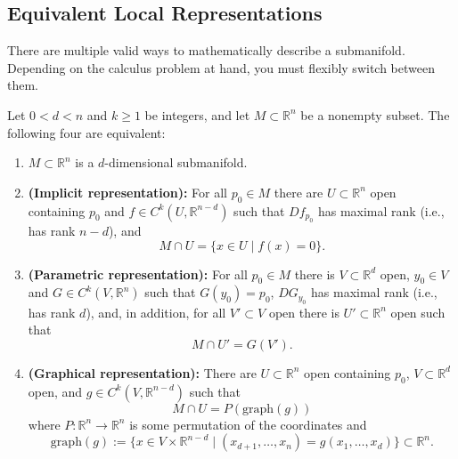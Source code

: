 \subsection{Equivalent Local Representations}

There are multiple valid ways to mathematically describe a submanifold. Depending on the calculus problem at hand, you must flexibly switch between them.

\setcounter{savedSec}{\value{section}}
\setcounter{savedThm}{\value{theorem}}

\setcounter{section}{12}
\setcounter{theorem}{11} %

\begin{proposition}
Let $0 < d < n$ and $k \ge 1$ be integers, and let $M \subset \mathbb{R}^n$ be a nonempty subset. The following four are equivalent:
\begin{enumerate}
    \item $M \subset \mathbb{R}^n$ is a $d$-dimensional submanifold.
    
    \item \textbf{(Implicit representation):} For all $p_0 \in M$ there are $U \subset \mathbb{R}^n$ open containing $p_0$ and $f \in C^k(U, \mathbb{R}^{n-d})$ such that $Df_{p_0}$ has maximal rank (i.e., has rank $n-d$), and
    \[
    M \cap U = \{x \in U \mid f(x) = 0\}.
    \]
    
    \item \textbf{(Parametric representation):} For all $p_0 \in M$ there is $V \subset \mathbb{R}^d$ open, $y_0 \in V$ and $G \in C^k(V, \mathbb{R}^n)$ such that $G(y_0) = p_0$, $DG_{y_0}$ has maximal rank (i.e., has rank $d$), and, in addition, for all $V' \subset V$ open there is $U' \subset \mathbb{R}^n$ open such that 
    \[
    M \cap U' = G(V').
    \]
    
    \item \textbf{(Graphical representation):} There are $U \subset \mathbb{R}^n$ open containing $p_0$, $V \subset \mathbb{R}^d$ open, and $g \in C^k(V, \mathbb{R}^{n-d})$ such that
    \[
    M \cap U = P(\text{graph}(g))
    \]
    where $P : \mathbb{R}^n \to \mathbb{R}^n$ is some permutation of the coordinates and 
    \[
    \text{graph}(g) := \{x \in V \times \mathbb{R}^{n-d} \mid (x_{d+1}, \dots, x_n) = g(x_1, \dots, x_d)\} \subset \mathbb{R}^n.
    \]
\end{enumerate}
\end{proposition}


